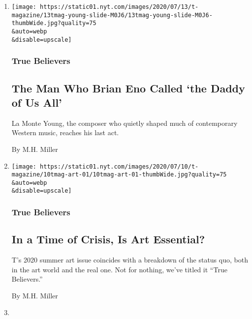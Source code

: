 \begin{enumerate}
\def\labelenumi{\arabic{enumi}.}
\item
  \href{/2020/07/22/t-magazine/la-monte-young.html}{}

  \texttt{[image: https://static01.nyt.com/images/2020/07/13/t-magazine/13tmag-young-slide-M0J6/13tmag-young-slide-M0J6-thumbWide.jpg?quality=75\\\&auto=webp\\\&disable=upscale]}

  \hypertarget{true-believers}{%
  \subsubsection{True Believers}\label{true-believers}}

  \hypertarget{the-man-who-brian-eno-called-the-daddy-of-us-all}{%
  \subsection{The Man Who Brian Eno Called `the Daddy of Us
  All'}\label{the-man-who-brian-eno-called-the-daddy-of-us-all}}

  La Monte Young, the composer who quietly shaped much of contemporary
  Western music, reaches his last act.

  By M.H. Miller
\item
  \href{/2020/07/20/t-magazine/museums-galleries-open-art.html}{}

  \texttt{[image: https://static01.nyt.com/images/2020/07/10/t-magazine/10tmag-art-01/10tmag-art-01-thumbWide.jpg?quality=75\\\&auto=webp\\\&disable=upscale]}

  \hypertarget{true-believers-1}{%
  \subsubsection{True Believers}\label{true-believers-1}}

  \hypertarget{in-a-time-of-crisis-is-art-essential}{%
  \subsection{In a Time of Crisis, Is Art
  Essential?}\label{in-a-time-of-crisis-is-art-essential}}

  T's 2020 summer art issue coincides with a breakdown of the status
  quo, both in the art world and the real one. Not for nothing, we've
  titled it ``True Believers.''

  By M.H. Miller
\item
  \href{/2020/04/24/t-magazine/george-condo-rashid-johnson-art.html}{}


\end{enumerate}

